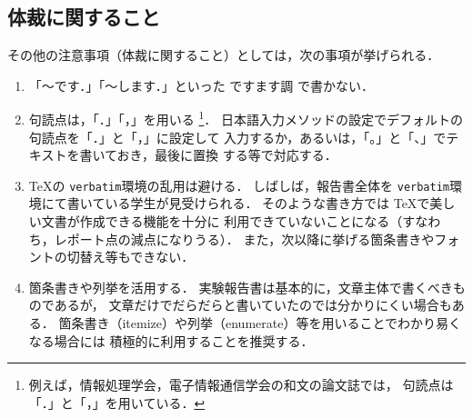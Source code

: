 \documentclass{jarticle}[11pt]
\newcommand{\COMMENT}[1]{}
\begin{document}
    \subsection{体裁に関すること}
     
    その他の注意事項（体裁に関すること）としては，次の事項が挙げられる．
    \begin{enumerate}
    \item 「〜です．」「〜します．」といった {\gt ですます調} で書かない．
     
    \item 句読点は，「．」「，」を用いる
    \footnote{例えば，情報処理学会，電子情報通信学会の和文の論文誌では，
    句読点は「．」と「，」を用いている．}．
    \COMMENT{
    \verb|~/.emacs| ファイルに次の式を記述をしておけば，デフォルトの
    句読点が「．」および「，」となる．
    \begin{quote}
    \begin{verbatim}
    ;; 2バイト文字の句読点設定 
    (setq its-hira-period "．") ;; 「．」は全角
    (setq its-hira-comma  "，") ;; 「，」は全角
    \end{verbatim}
    \end{quote}
    上記設定をしていない場合に「．」および「，」をタイプする場合，
    日本語モードでそれぞれ\verb|Z-.|（大文字のZをタイプ後，ピリオド(.)をタイプ），
    \verb|Z-,|（大文字のZをタイプ後，カンマ(,)をタイプ）を入力する．
    } %
    日本語入力メソッドの設定でデフォルトの句読点を「．」と「，」に設定して
    入力するか，あるいは，「。」と「、」でテキストを書いておき，最後に置換
    する等で対応する．
     
    \item \TeX の \verb|verbatim|環境の乱用は避ける．
    しばしば，報告書全体を \verb|verbatim|環境にて書いている学生が見受けられる．
    そのような書き方では \TeX で美しい文書が作成できる機能を十分に
    利用できていないことになる（すなわち，レポート点の減点になりうる）．
    また，次以降に挙げる箇条書きやフォントの切替え等もできない．
     
    \item 箇条書きや列挙を活用する．
    実験報告書は基本的に，文章主体で書くべきものであるが，
    文章だけでだらだらと書いていたのでは分かりにくい場合もある．
    箇条書き（itemize）や列挙（enumerate）等を用いることでわかり易くなる場合には
    積極的に利用することを推奨する．
     

\end{enumerate}
\end{document}
